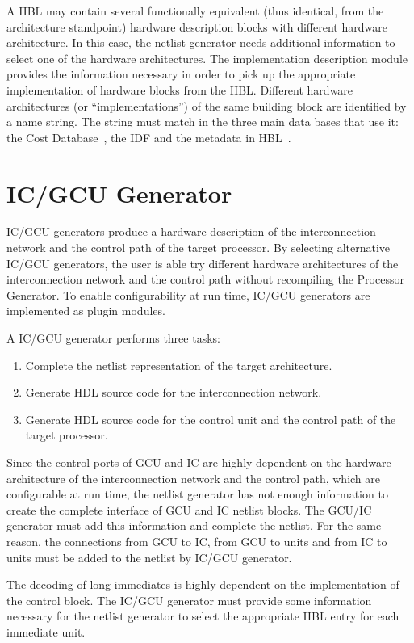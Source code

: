 \documentclass[a4paper,twoside]{tce}
\begin{document}
A HBL may contain several functionally equivalent (thus identical, from the
architecture standpoint) hardware description blocks with different hardware
architecture. In this case, the netlist generator needs additional
information to select one of the hardware architectures. The implementation
description module provides the information necessary in order to pick up
the appropriate implementation of hardware blocks from the HBL. Different
hardware architectures (or ``implementations'') of the same building block
are identified by a name string. The string must match in the three main
data bases that use it: the Cost Database~\cite{EstimatorSpecs}, the IDF and
the metadata in HBL~\cite{ProGeSpecs}.

\section{IC/GCU Generator}

IC/GCU generators produce a hardware description of the interconnection
network and the control path of the target processor.
%
By selecting alternative IC/GCU generators, the user is able try different
hardware architectures of the interconnection network and the control path
without recompiling the Processor Generator. To enable configurability at
run time, IC/GCU generators are implemented as plugin modules.

A IC/GCU generator performs three tasks:
%
\begin{enumerate}
\item%
  Complete the netlist representation of the target architecture.
\item%
  Generate HDL source code for the interconnection network.
\item%
  Generate HDL source code for the control unit and the control path of the
  target processor.
\end{enumerate}

Since the control ports of GCU and IC are highly dependent on the hardware
architecture of the interconnection network and the control path, which are
configurable at run time, the netlist generator has not enough information
to create the complete interface of GCU and IC netlist blocks. The GCU/IC
generator must add this information and complete the netlist.
%
For the same reason, the connections from GCU to IC, from GCU to units
and from IC to units must be added to the netlist by IC/GCU generator.

The decoding of long immediates is highly dependent on the implementation of
the control block. The IC/GCU generator must provide some information
necessary for the netlist generator to select the appropriate HBL entry for
each immediate unit.
\end{document}
